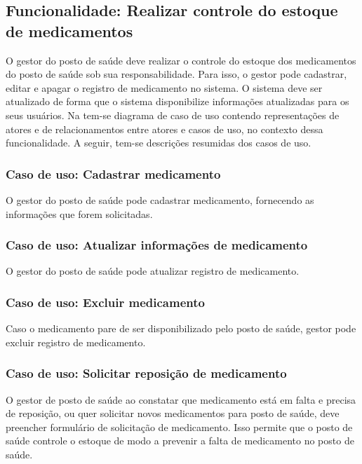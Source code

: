 %


\subsection{Funcionalidade: Realizar controle do estoque de medicamentos}

%

O gestor do posto de saúde deve realizar o controle do estoque dos medicamentos do posto de saúde sob sua responsabilidade. Para isso, o gestor pode cadastrar, editar e apagar o registro de medicamento no sistema. O sistema deve ser atualizado de forma que o sistema disponibilize informações atualizadas para os seus usuários. Na  tem-se diagrama de caso de uso contendo representações de atores e de relacionamentos entre atores e casos de uso, no contexto dessa funcionalidade. A seguir, tem-se descrições resumidas dos casos de uso.

\subsubsection{Caso de uso: Cadastrar medicamento}

O gestor do posto de saúde pode cadastrar medicamento, fornecendo as informações que forem solicitadas.

\subsubsection{Caso de uso: Atualizar informações de medicamento}

O gestor do posto de saúde pode atualizar registro de medicamento.

\subsubsection{Caso de uso: Excluir medicamento}

Caso o medicamento pare de ser disponibilizado pelo posto de saúde, gestor pode excluir registro de medicamento.

\subsubsection{Caso de uso: Solicitar reposição de medicamento}
O gestor de posto de saúde ao constatar que medicamento está em falta e precisa de reposição, ou quer solicitar novos medicamentos para posto de saúde, deve preencher formulário de solicitação de medicamento. Isso permite que o posto de saúde controle o estoque de modo a prevenir a falta de medicamento no posto de saúde.

